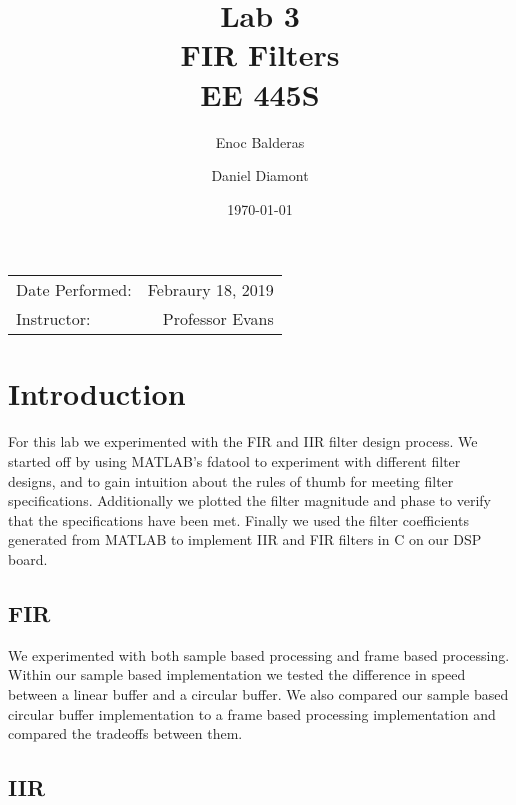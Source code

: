 \documentclass{article}
\title{Lab 3\\ FIR Filters\\ EE 445S} %
\author{Enoc Balderas\\
        \and
        Daniel Diamont\\} %
\date{\today} %
\begin{document}
\maketitle %

\begin{center}
\begin{tabular}{l r}
Date Performed: & Febraury 18, 2019 \\ %
Instructor: & Professor Evans %
\end{tabular}
\end{center}



\section{Introduction}

For this  lab we experimented with the FIR and IIR filter design process.
We started off by using MATLAB's fdatool to experiment with different filter designs, and to gain intuition about the rules of thumb for meeting filter specifications.
Additionally we plotted the filter magnitude and phase to verify that the specifications have been met.
Finally we used the filter coefficients generated from MATLAB to implement IIR and FIR filters in C on our DSP board.

\subsection{FIR}

We experimented with both sample based processing and frame based processing.
Within our sample based implementation we tested the difference in speed between a linear buffer and a circular buffer.
We also compared our sample based circular buffer implementation to a frame based processing implementation and compared the tradeoffs between them.

\subsection{IIR}
\end{document}
